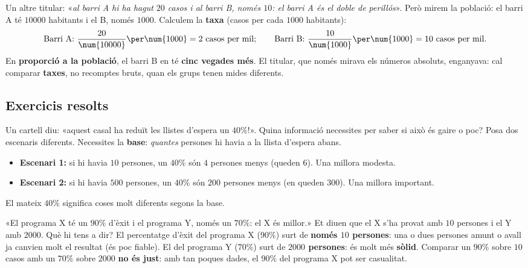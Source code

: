 \begin{exemple}
Un altre titular: «\emph{al barri A hi ha hagut $20$ casos i al barri B, només $10$:
el barri A és el doble de perillós}». Però mirem la població: el barri A té
$\num{10000}$ habitants i el B, només $\num{1000}$. Calculem la \textbf{taxa} (casos
per cada $\num{1000}$ habitants):
\[
\text{Barri A: } \frac{20}{\num{10000}}\per\num{1000}=2 \ \text{casos per mil};\qquad
\text{Barri B: } \frac{10}{\num{1000}}\per\num{1000}=10 \ \text{casos per mil}.
\]
En \textbf{proporció a la població}, el barri B en té \textbf{cinc vegades més}. El
titular, que només mirava els números absoluts, enganyava: cal comparar
\textbf{taxes}, no recomptes bruts, quan els grups tenen mides diferents.
\end{exemple}

\subsection{Exercicis resolts}

\begin{exresolt}
Un cartell diu: «aquest casal ha reduït les llistes d'espera un $40\%$!». Quina
informació necessites per saber si això és gaire o poc? Posa dos escenaris diferents.
\solucio
Necessites la \textbf{base}: \emph{quantes} persones hi havia a la llista d'espera
abans.
\begin{itemize}[leftmargin=1.4em, itemsep=1pt]
  \item \textbf{Escenari 1:} si hi havia $10$ persones, un $40\%$ són $4$ persones
        menys (queden $6$). Una millora modesta.
  \item \textbf{Escenari 2:} si hi havia $500$ persones, un $40\%$ són $200$ persones
        menys (en queden $300$). Una millora important.
\end{itemize}
El mateix $40\%$ significa coses molt diferents segons la base.
\end{exresolt}

\begin{exresolt}
«El programa X té un $90\%$ d'èxit i el programa Y, només un $70\%$: el X és millor.»
Et diuen que el X s'ha provat amb $10$ persones i el Y amb $\num{2000}$. Què hi tens a
dir?
\solucio
El percentatge d'èxit del programa X ($90\%$) surt de \textbf{només $10$ persones}: una
o dues persones amunt o avall ja canvien molt el resultat (és poc fiable). El del
programa Y ($70\%$) surt de \textbf{$\num{2000}$ persones}: és molt més \textbf{sòlid}.
Comparar un $90\%$ sobre $10$ casos amb un $70\%$ sobre $\num{2000}$ \textbf{no és
just}: amb tan poques dades, el $90\%$ del programa X pot ser casualitat.
\end{exresolt}

